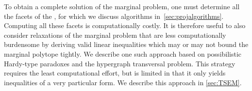 {%


To obtain a complete solution of the marginal problem, one must determine all the facets of the , for which we discuss algorithms in~\cref{sec:projalgorithms}.
Computing all these facets is computationally costly.  It is therefore useful to also consider relaxations of the marginal problem that are less computationally burdensome by deriving valid linear inequalities which may or may not bound the marginal polytope tightly.
We describe one such approach based on possibilistic Hardy-type paradoxes and the hypergraph transversal problem. This strategy requires the least computational effort, but is limited in that it only yields inequalities of a very particular form.  We describe this approach in \cref{sec:TSEM}.


}
